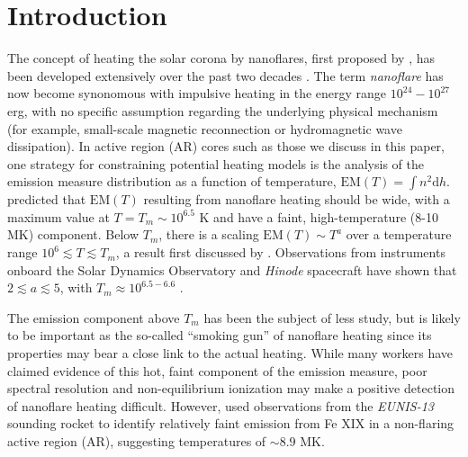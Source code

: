 \documentclass[preprint,linenumbers]{aastex}
\begin{document}
	\section{Introduction}
	\label{sec:intro}
	\par The concept of heating the solar corona by nanoflares, first proposed by \citet{parker_nanoflares_1988}, has been developed extensively over the past two decades \citep[e.g.][]{cargill_implications_1994,cargill_nanoflare_2004,klimchuk_solving_2006}. The term \textit{nanoflare} has now become synonomous with impulsive heating in the energy range $10^{24}-10^{27}$ erg, with no specific assumption regarding the underlying physical mechanism (for example, small-scale magnetic reconnection or hydromagnetic wave dissipation).
	In active region (AR) cores such as those we discuss in this paper, one strategy for constraining potential heating models is the analysis of the emission measure distribution as a function of temperature, $\mathrm{EM}(T)=\int n^2\mathrm{d}h$. \citet{cargill_implications_1994,cargill_nanoflare_2004} predicted that $\mathrm{EM}(T)$ resulting from nanoflare heating should be wide, with a maximum value at $T=T_m\sim10^{6.5}$ K and have a faint, high-temperature (8-10 MK) component. Below $T_m$, there is a scaling $\mathrm{EM}(T)\sim T^a$ over a temperature range $10^6\lesssim T\lesssim T_m$, a result first discussed by \citet{jordan_structure_1975}. Observations from instruments onboard the Solar Dynamics Observatory \citep[SDO,][]{pesnell_solar_2012} and \textit{Hinode} spacecraft \citep{kosugi_hinode_2007} have shown that $2\lesssim a\lesssim5$, with $T_m\approx10^{6.5-6.6}$ \citep{warren_constraints_2011,warren_systematic_2012,winebarger_using_2011,tripathi_emission_2011,schmelz_cold_2012,del_zanna_evolution_2015}.
	\par The emission component above $T_m$ has been the subject of less study, but is likely to be important as the so-called ``smoking gun'' of nanoflare heating since its properties may bear a close link to the actual heating. While many workers \citep{reale_evidence_2009,schmelz_hinode_2009,miceli_x-ray_2012,testa_hinode/eis_2012,del_zanna_elemental_2014,petralia_thermal_2014,schmelz_hot_2015} have claimed evidence of this hot, faint component of the emission measure, poor spectral resolution \citep{testa_temperature_2011,winebarger_defining_2012} and non-equilibrium ionization \citep{bradshaw_explosive_2006,reale_nonequilibrium_2008} may make a positive detection of nanoflare heating difficult. However, \citet{brosius_pervasive_2014} used observations from the \textit{EUNIS-13} sounding rocket to identify relatively faint emission from Fe XIX in a non-flaring active region (AR), suggesting temperatures of $\sim8.9$ MK.
\end{document}
